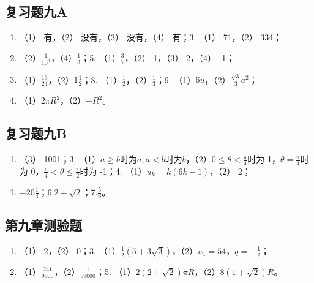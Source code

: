 \subsection{复习题九A}

\begin{enumerate}[start=2]
\item
  （1） 有，（2） 没有，（3） 没有，（4） 有；3. （1） 71，（2） 334；
\item
  （2）\(\frac{1}{10^n}\)，（4）\(\frac{1}{3}\)；5.
  （1）\(\frac{3}{7}\)，（2） 1，（3） 2，（4） -1；
\item
  （1）\(\frac{13}{24}\)，（2）\(1\frac{1}{2}\)；8.
  （1）\(\frac{1}{2}\)，（2）\(\frac{1}{3}\)；9.
  （1）\(6u\)，（2）\(\frac{\sqrt{3}}{3}a^2\)；
\item
  （1）\(2\pi R^2\)，（2）\(\pm R^2\)。
\end{enumerate}

\subsection{复习题九B}

\begin{enumerate}[start=2]
\item
  （3） 1001；3.
  （1）\(a \geqslant b\)时为\(a, a < b\)时为\(b\)，（2）\(0 \leqslant \theta < \frac{\pi}{4}\)时为
  1，\(\theta = \frac{\pi}{4}\)时为
  0，\(\frac{\pi}{4} < \theta \leqslant \frac{\pi}{2}\)时为 -1；4.
  （1）\(u_{k} = k(6k - 1)\)，（2） 2；
\end{enumerate}

\begin{enumerate}[start=5]
\item
  \(-20\frac{1}{4}\)；6.\(2 + \sqrt{2}\)；7.\(\frac{5}{6}\)。
\end{enumerate}

\subsection{第九章测验题}

\begin{enumerate}[start=2]
\item
  （1） 2，（2） 0；3.
  （1）\(\frac{1}{2}(5 + 3\sqrt{3})\)，（2）\(u_{1} = 54\)，\(q = -\frac{1}{2}\)；
\item
  （1）\(\frac{241}{9900}\)，（2）\(\frac{1}{99000}\)；5.
  （1）\(2(2 + \sqrt{2})\pi R\)，（2）\(8(1 + \sqrt{2})R\)。
\end{enumerate}


